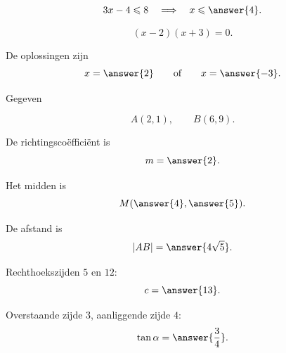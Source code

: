 \documentclass{ximera}
\begin{document}
\begin{oefening}{\oefB\ESS}

\begin{question}
\[
3x-4\leq8
\quad\Longrightarrow\quad
x\leq\answer{4}.
\]
\end{question}

\begin{question}
\[
(x-2)(x+3)=0.
\]

De oplossingen zijn
\[
x=\answer{2}
\qquad\text{of}\qquad
x=\answer{-3}.
\]
\end{question}

\end{oefening}


\begin{oefening}{\oefB\ESS}

Gegeven

\[
A(2,1),
\qquad
B(6,9).
\]

\begin{question}
De richtingscoëfficiënt is
\[
m=\answer{2}.
\]
\end{question}

\begin{question}
Het midden is
\[
M(\answer{4},\answer{5}).
\]
\end{question}

\begin{question}
De afstand is
\[
|AB|=\answer{4\sqrt5}.
\]
\end{question}

\end{oefening}


\begin{oefening}{\oefB\ESS}

\begin{question}
Rechthoekszijden \(5\) en \(12\):
\[
c=\answer{13}.
\]
\end{question}

\begin{question}
Overstaande zijde \(3\), aanliggende zijde \(4\):
\[
\tan\alpha=\answer{\frac34}.
\]
\end{question}

\end{oefening}
\end{document}
